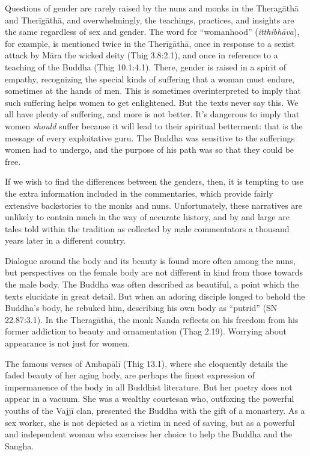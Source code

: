 \documentclass[12pt,openany]{book}%
\begin{document}
Questions of gender are rarely raised by the nuns and monks in the \textsanskrit{Theragāthā} and \textsanskrit{Therīgāthā}, and overwhelmingly, the teachings, practices, and insights are the same regardless of sex and gender. The word for “womanhood” (\textit{\textsanskrit{itthibhāva}}), for example, is mentioned twice in the \textsanskrit{Therīgāthā}, once in response to a sexist attack by \textsanskrit{Māra} the wicked deity (Thig 3.8:2.1), and once in reference to a teaching of the Buddha (Thig 10.1:4.1). There, gender is raised in a spirit of empathy, recognizing the special kinds of suffering that a woman must endure, sometimes at the hands of men. This is sometimes overinterpreted to imply that such suffering helps women to get enlightened. But the texts never say this. We all have plenty of suffering, and more is not better. It’s dangerous to imply that women \emph{should} suffer because it will lead to their spiritual betterment: that is the message of every exploitative guru. The Buddha was sensitive to the sufferings women had to undergo, and the purpose of his path was so that they could be free.

If we wish to find the differences between the genders, then, it is tempting to use the extra information included in the commentaries, which provide fairly extensive backstories to the monks and nuns. Unfortunately, these narratives are unlikely to contain much in the way of accurate history, and by and large are tales told within the tradition as collected by male commentators a thousand years later in a different country.

Dialogue around the body and its beauty is found more often among the nuns, but perspectives on the female body are not different in kind from those towards the male body. The Buddha was often described as beautiful, a point which the texts elucidate in great detail. But when an adoring disciple longed to behold the Buddha’s body, he rebuked him, describing his own body as “putrid” (SN 22.87:3.1). In the \textsanskrit{Theragāthā}, the monk Nanda reflects on his freedom from his former addiction to beauty and ornamentation (Thag 2.19). Worrying about appearance is not just for women.

The famous verses of \textsanskrit{Ambapālī} (Thig 13.1), where she eloquently details the faded beauty of her aging body, are perhaps the finest expression of impermanence of the body in all Buddhist literature. But her poetry does not appear in a vacuum. She was a wealthy courtesan who, outfoxing the powerful youths of the \textsanskrit{Vajjī} clan, presented the Buddha with the gift of a monastery. As a sex worker, she is not depicted as a victim in need of saving, but as a powerful and independent woman who exercises her choice to help the Buddha and the Sangha. 
\end{document}
